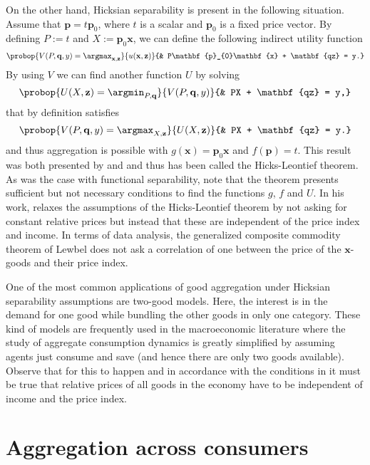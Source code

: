\documentclass[english, a4paper,12pt]{article}
\begin{document}
On the other hand, Hicksian separability is present in the following situation. Assume that $\mathbf{p} = t\mathbf{p}_{0}$, where $t$ is a scalar and $\mathbf{p}_{0}$ is a fixed price vector. By defining $P := t$ and $X := \mathbf{p}_{0}\mathbf{x}$, we can define the following indirect utility function
	$$	\probop{V(P, \mathbf{q}, y) = \argmax_{\mathbf{x}, \mathbf{z}}}{u(\mathbf{x}, \mathbf{z})}
				{&	P\mathbf{p}_{0}\mathbf{x} + \mathbf{qz} = y.}
	$$
By using $V$ we can find another function $U$ by solving
	$$	\probop{U(X, \mathbf{z}) = \argmin_{P, \mathbf{q}}}{V(P, \mathbf{q},y)}
				{&	PX + \mathbf{qz} = y,}
	$$
that by definition satisfies
	$$	\probop{V(P, \mathbf{q}, y) = \argmax_{X, \mathbf{z}}}{U(X, \mathbf{z})}
				{&	PX + \mathbf{qz} = y.}
	$$
and thus aggregation is possible with $g(\mathbf{x}) = \mathbf{p}_{0}\mathbf{x}$ and $f(\mathbf{p}) = t$. This result was both presented by \cite{Leontief36} and \cite{HicksBook} and thus has been called the Hicks-Leontief theorem. As was the case with functional separability, note that the theorem presents sufficient but not necessary conditions to find the functions $g$, $f$ and $U$. In his work, \cite{Lewbel96} relaxes the assumptions of the Hicks-Leontief theorem by not asking for constant relative prices but instead that these are independent of the price index and income. In terms of data analysis, the generalized composite commodity theorem of Lewbel does not ask a correlation of one between the price of the $\mathbf{x}$-goods and their price index.

One of the most common applications of good aggregation under Hicksian separability assumptions are two-good models. Here, the interest is in the demand for one good while bundling the other goods in only one category. These kind of models are frequently used in the macroeconomic literature where the study of aggregate consumption dynamics is greatly simplified by assuming agents just consume and save (and hence there are only two goods available). Observe that for this to happen and in accordance with the conditions in \cite{Lewbel96} it must be true that relative prices of all goods in the economy have to be independent of income and the price index. 

\section{Aggregation across consumers} \label{sec:repagent}
\end{document}
